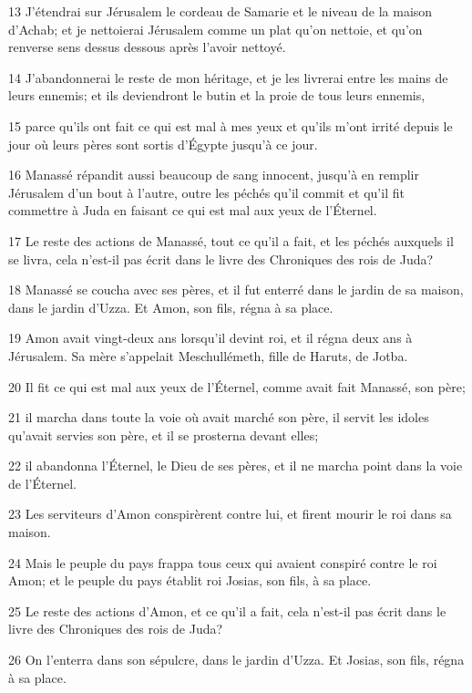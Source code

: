 \par 13 J'étendrai sur Jérusalem le cordeau de Samarie et le niveau de la maison d'Achab; et je nettoierai Jérusalem comme un plat qu'on nettoie, et qu'on renverse sens dessus dessous après l'avoir nettoyé.
\par 14 J'abandonnerai le reste de mon héritage, et je les livrerai entre les mains de leurs ennemis; et ils deviendront le butin et la proie de tous leurs ennemis,
\par 15 parce qu'ils ont fait ce qui est mal à mes yeux et qu'ils m'ont irrité depuis le jour où leurs pères sont sortis d'Égypte jusqu'à ce jour.
\par 16 Manassé répandit aussi beaucoup de sang innocent, jusqu'à en remplir Jérusalem d'un bout à l'autre, outre les péchés qu'il commit et qu'il fit commettre à Juda en faisant ce qui est mal aux yeux de l'Éternel.
\par 17 Le reste des actions de Manassé, tout ce qu'il a fait, et les péchés auxquels il se livra, cela n'est-il pas écrit dans le livre des Chroniques des rois de Juda?
\par 18 Manassé se coucha avec ses pères, et il fut enterré dans le jardin de sa maison, dans le jardin d'Uzza. Et Amon, son fils, régna à sa place.
\par 19 Amon avait vingt-deux ans lorsqu'il devint roi, et il régna deux ans à Jérusalem. Sa mère s'appelait Meschullémeth, fille de Haruts, de Jotba.
\par 20 Il fit ce qui est mal aux yeux de l'Éternel, comme avait fait Manassé, son père;
\par 21 il marcha dans toute la voie où avait marché son père, il servit les idoles qu'avait servies son père, et il se prosterna devant elles;
\par 22 il abandonna l'Éternel, le Dieu de ses pères, et il ne marcha point dans la voie de l'Éternel.
\par 23 Les serviteurs d'Amon conspirèrent contre lui, et firent mourir le roi dans sa maison.
\par 24 Mais le peuple du pays frappa tous ceux qui avaient conspiré contre le roi Amon; et le peuple du pays établit roi Josias, son fils, à sa place.
\par 25 Le reste des actions d'Amon, et ce qu'il a fait, cela n'est-il pas écrit dans le livre des Chroniques des rois de Juda?
\par 26 On l'enterra dans son sépulcre, dans le jardin d'Uzza. Et Josias, son fils, régna à sa place.

